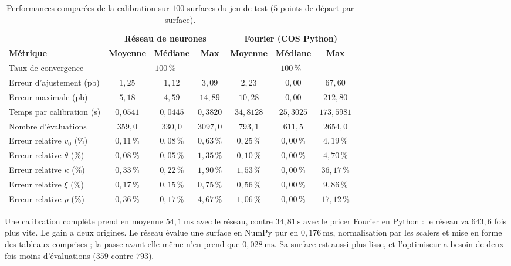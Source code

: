\begin{table}[htbp]
\centering
\caption{Performances comparées de la calibration sur $100$ surfaces du jeu de test ($5$ points de départ par surface).}
\label{tab-calib-simulee}
\small
\setlength{\tabcolsep}{4pt}
\begin{tabular}{lcccccc}
\toprule
 & \multicolumn{3}{c}{\textbf{Réseau de neurones}} & \multicolumn{3}{c}{\textbf{Fourier (COS Python)}} \\
\cmidrule(lr){2-4} \cmidrule(lr){5-7}
\textbf{Métrique} & \textbf{Moyenne} & \textbf{Médiane} & \textbf{Max} & \textbf{Moyenne} & \textbf{Médiane} & \textbf{Max} \\
\midrule
Taux de convergence & \multicolumn{3}{c}{$100\,\%$} & \multicolumn{3}{c}{$100\,\%$} \\
Erreur d'ajustement (pb) & $1{,}25$ & $1{,}12$ & $3{,}09$ & $2{,}23$ & $0{,}00$ & $67{,}60$ \\
Erreur maximale (pb) & $5{,}18$ & $4{,}59$ & $14{,}89$ & $10{,}28$ & $0{,}00$ & $212{,}80$ \\
Temps par calibration (s) & $0{,}0541$ & $0{,}0445$ & $0{,}3820$ & $34{,}8128$ & $25{,}3025$ & $173{,}5981$ \\
Nombre d'évaluations & $359{,}0$ & $330{,}0$ & $3097{,}0$ & $793{,}1$ & $611{,}5$ & $2654{,}0$ \\
\midrule
Erreur relative $v_0$ (\%) & $0{,}11\,\%$ & $0{,}08\,\%$ & $0{,}63\,\%$ & $0{,}25\,\%$ & $0{,}00\,\%$ & $4{,}19\,\%$ \\
Erreur relative $\theta$ (\%) & $0{,}08\,\%$ & $0{,}05\,\%$ & $1{,}35\,\%$ & $0{,}10\,\%$ & $0{,}00\,\%$ & $4{,}70\,\%$ \\
Erreur relative $\kappa$ (\%) & $0{,}33\,\%$ & $0{,}22\,\%$ & $1{,}90\,\%$ & $1{,}53\,\%$ & $0{,}00\,\%$ & $36{,}17\,\%$ \\
Erreur relative $\xi$ (\%) & $0{,}17\,\%$ & $0{,}15\,\%$ & $0{,}75\,\%$ & $0{,}56\,\%$ & $0{,}00\,\%$ & $9{,}86\,\%$ \\
Erreur relative $\rho$ (\%) & $0{,}36\,\%$ & $0{,}17\,\%$ & $4{,}67\,\%$ & $1{,}06\,\%$ & $0{,}00\,\%$ & $17{,}12\,\%$ \\
\bottomrule
\end{tabular}
\end{table}

Une calibration complète prend en moyenne $54{,}1~\text{ms}$ avec le réseau, contre $34{,}81~\text{s}$ avec le
pricer Fourier en Python : le réseau va $643{,}6$ fois plus vite. Le gain a deux origines. Le réseau évalue une
surface en NumPy pur en $0{,}176~\text{ms}$, normalisation par les scalers et mise en forme des tableaux comprises ;
la passe avant elle-même n'en prend que $0{,}028~\text{ms}$. Sa surface est aussi plus lisse, et l'optimiseur a
besoin de deux fois moins d'évaluations ($359$ contre $793$).

